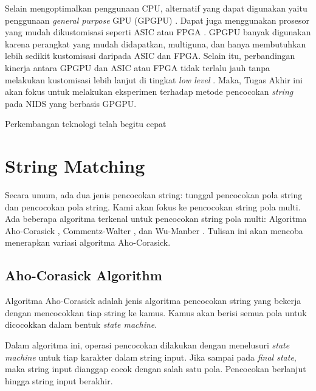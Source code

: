 \documentclass[conference]{IEEEtran}
\begin{document}
Selain mengoptimalkan penggunaan CPU, alternatif yang dapat digunakan yaitu penggunaan \emph{general purpose} GPU (GPGPU) \cite{4482891}. Dapat juga menggunakan prosesor yang mudah dikustomisasi seperti ASIC atau FPGA \cite{fpga2008}. GPGPU banyak digunakan karena perangkat yang mudah didapatkan, multiguna, dan hanya membutuhkan lebih sedikit kustomisasi daripada ASIC dan FPGA. Selain itu, perbandingan kinerja antara GPGPU dan ASIC atau FPGA tidak terlalu jauh tanpa melakukan kustomisasi lebih lanjut di tingkat \emph{low level} \cite{gnort2008}. Maka, Tugas Akhir ini akan fokus untuk melakukan eksperimen terhadap metode pencocokan \emph{string} pada NIDS yang berbasis GPGPU.



Perkembangan teknologi telah begitu cepat 

\section{String Matching}
Secara umum, ada dua jenis pencocokan string: tunggal pencocokan pola string dan pencocokan pola string. Kami akan fokus ke pencocokan string pola multi. Ada beberapa algoritma terkenal untuk pencocokan string pola multi: Algoritma Aho-Corasick \cite{ahoc1975}, Commentz-Walter \cite{walter1980}, dan Wu-Manber \cite{wu92}. Tulisan ini akan mencoba menerapkan variasi algoritma Aho-Corasick.

    \subsection{Aho-Corasick Algorithm}
    Algoritma Aho-Corasick adalah jenis algoritma pencocokan string yang bekerja dengan mencocokkan tiap string ke kamus. Kamus akan berisi semua pola untuk dicocokkan dalam bentuk \emph{state machine}.
    
    Dalam algoritma ini, operasi pencocokan dilakukan dengan menelusuri \emph{state machine} untuk tiap karakter dalam string input. Jika sampai pada \emph{final state}, maka string input dianggap cocok dengan salah satu pola. Pencocokan berlanjut hingga string input berakhir. 
\end{document}
